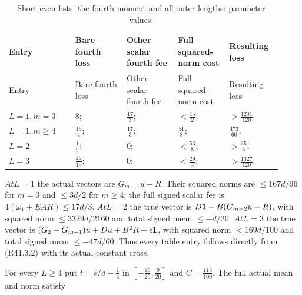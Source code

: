 \begingroup\small
\setlength{\tabcolsep}{3pt}
\setlength{\LTleft}{0pt}\setlength{\LTright}{\fill}
\begin{longtable}{@{}p{0.2200\linewidth}p{0.1750\linewidth}p{0.1750\linewidth}p{0.1750\linewidth}p{0.1750\linewidth}@{}}
\caption{Short even lists: the fourth moment and all outer lengths: parameter values.}\label{tab:parameters:r2-c041:2}\\
\toprule
Entry & Bare fourth loss & Other scalar fourth fee & Full squared-norm cost & Resulting loss \\
\midrule\endfirsthead
\toprule
Entry & Bare fourth loss & Other scalar fourth fee & Full squared-norm cost & Resulting loss \\
\midrule\endhead
\bottomrule\endfoot
\(L=1,\allowbreak \allowbreak m=3\) & 8; & \(\frac{17}{3}\); & \(<\frac{15}{2}\); & \(>\frac{1201}{120}\). \\
\addlinespace[2pt]
\(L=1,\allowbreak \allowbreak m\ge 4\) & \(\frac{19}{4}\); & \(\frac{17}{3}\); & \(\frac{51}{8}\); & \(\frac{473}{60}\). \\
\addlinespace[2pt]
\(L=2\) & \(\frac{1}{5}\); & 0; & \(<\frac{53}{8}\); & \(>\frac{35}{4}\). \\
\addlinespace[2pt]
\(L=3\) & \(\frac{47}{15}\); & 0; & \(<\frac{29}{4}\); & \(>\frac{1327}{120}\). \\
\end{longtable}
\endgroup


\(At L=1\) the actual vectors are \(G_{m-1}u-R\). Their squared norms are \(\le 167d/96\) for \(m=3\) and \(\le 3d/2\) for \(m\ge 4\); the full signed scalar fee is \(4(\omega_1+EAR)\le 17d/3\). \(At L=2\) the true vector is \(D\mathbf1-B(G_{m-2}u-R)\), with squared norm \(\le 3329d/2160\) and total signed mean \(\le -d/20\). \(At L=3\) the true vector is \((G_{2}-G_{m-1})u+D u+B^2R+\epsilon\mathbf1\), with squared norm \(<169d/100\) and total signed mean \(\le -47d/60\). Thus every table entry follows directly from (R41.3.2) with its actual constant cross.

For every \(L\ge 4\) put \(t=\epsilon/d-\frac{1}{4}\) in \([-\frac{19}{20},\allowbreak \allowbreak \frac{9}{20}]\) and \(C=\frac{113}{100}\). The full actual mean and norm satisfy


